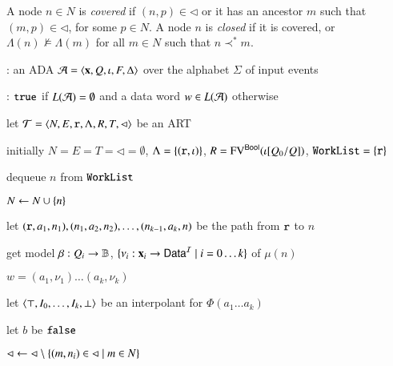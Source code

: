 \documentclass[10pt,conference,letterpaper,twocolumn]{IEEEtran}
\begin{document}
A node $n \in N$ is \emph{covered} if $(n,p) \in \lhd$ or it has an
ancestor $m$ such that $(m,p) \in \lhd$, for some $p \in N$. A node
$n$ is \emph{closed} if it is covered, or $\Lambda(n) \not\models
\Lambda(m)$ for all $m \in N$ such that $n \prec^* m$.

\begin{algorithm}[t!]
{\scriptsize\begin{algorithmic}[0]
  : an ADA $\mathcal{A} = \left\langle \mathbf x,Q,\iota,F,\Delta \right\rangle$
  over the alphabet $\Sigma$ of input events

  : $\mathtt{true}$ if $L(\mathcal{A})=\emptyset$ and a data word $w
  \in L(\mathcal{A})$ otherwise
\end{algorithmic}}

{\scriptsize\begin{algorithmic}[1] 

  \State let $\mathcal{T} = \left\langle N,E,\mathtt{r},\Lambda,R,T,\lhd \right\rangle$ be an ART

  \State initially $N = E = T = \lhd = \emptyset$, $\Lambda =
  \left\{ (\mathtt{r},\iota) \right\}$, $R = \mathrm{FV}^{\mathsf{Bool}}(\iota[Q_0/Q])$,
  $\mathtt{WorkList}=\left\{ \mathtt{r} \right\}$
  
  \While{$\worklist \neq \emptyset$}
  \label{ln:impact-while}

  \State dequeue $n$ from $\mathtt{WorkList}$ 
  \label{ln:impact-dequeue}

  \State $N \leftarrow N \cup \left\{ n \right\}$

  \State let $(\mathtt{r},a_1,n_1),(n_1,a_2,n_2), \ldots,
  (n_{k-1},a_k,n)$ be the path from $\mathtt{r}$ to $n$


  \State get model $\beta : Q_i \rightarrow \mathbb{B}$, $\{\nu_i :
  \mathbf x_i \rightarrow \mathsf{Data}^{\mathcal{I}} \mid i=0\ldots k\}$ of $\mu(n)$

   $w = (a_1,\nu_1) \ldots (a_k,\nu_k)$
  \label{ln:impact-nonempty}

  \Else {}

  \State let $\left\langle \top,I_0,\ldots,I_k,\bot \right\rangle$ be an interpolant for
  $\Phi(a_1 \ldots a_k)$
  \label{ln:refine-begin}

  \State let $b$ be $\mathtt{false}$



  \State $\lhd \leftarrow \lhd \setminus \left\{ (m,n_i) \in \lhd \mid m \in N \right\}$


\end{algorithmic}}
\end{algorithm}
\end{document}
